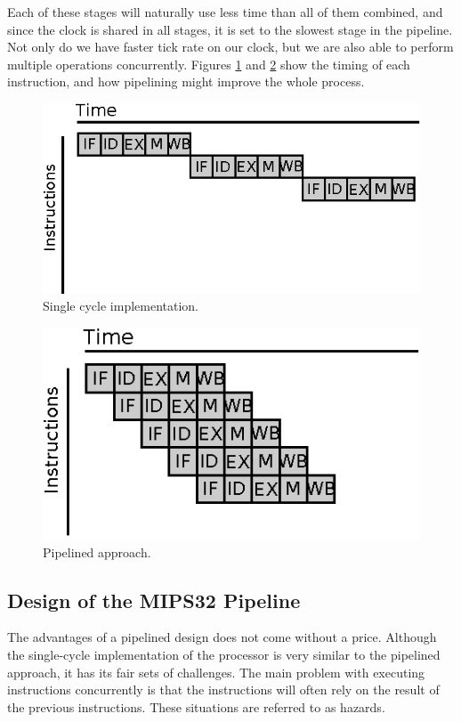 Each of these stages will naturally use less time than all of them combined, and
since the clock is shared in all stages, it is set to the slowest stage in the
pipeline.\\
Not only do we have faster tick rate on our clock, but we are also able to
perform multiple operations concurrently. Figures \ref{fig:single_cycle_time}
and \ref{fig:pipeline_time} show the timing of each instruction, and how
pipelining might improve the whole process.
\begin{figure}[H]
        \includegraphics{pipeline/single_cycle.eps}
	\caption{Single cycle implementation.}
        \label{fig:single_cycle_time}
\end{figure}
\begin{figure}[H]
        \includegraphics{pipeline/pipeline.eps}
	\caption{Pipelined approach.}
        \label{fig:pipeline_time}
\end{figure}


\subsection{Design of the MIPS32 Pipeline}
The advantages of a pipelined design does not come without a price. Although
the single-cycle implementation of the processor is very similar to the
pipelined approach, it has its fair sets of challenges. The main problem with
executing instructions concurrently is that the instructions will often rely on
the result of the previous instructions. These situations are referred to as
hazards.

